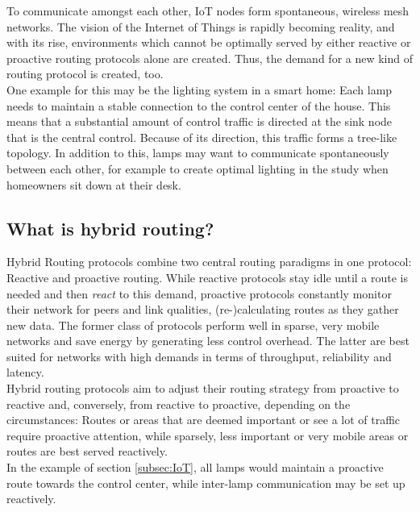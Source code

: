 \documentclass[a4paper,10pt]{scrartcl}
\begin{document}
To communicate amongst each other, IoT nodes form spontaneous, wireless mesh networks.
The vision of the Internet of Things is rapidly becoming reality, and with its rise, environments which cannot be optimally served by either reactive or proactive routing protocols alone are created. Thus, the demand for a new kind of routing protocol is created, too.\\
One example for this may be the lighting system in a smart home: Each lamp needs to maintain a stable connection to the control center of the house. This means that a substantial amount of control traffic is directed at the sink node that is the central control. Because of its direction, this traffic forms a tree-like topology. In addition to this, lamps may want to communicate spontaneously between each other, for example to create optimal lighting in the study when homeowners sit down at their desk.

\subsection{What is hybrid routing?}
\label{subsec:hybrid}
Hybrid Routing protocols combine two central routing paradigms in one protocol: Reactive and proactive routing. While reactive protocols stay idle until a route is needed and then \emph{react} to this demand, proactive protocols constantly monitor their network for peers and link qualities, (re-)calculating routes as they gather new data. The former class of protocols perform well in sparse, very mobile networks and save energy by generating less control overhead. The latter are best suited for networks with high demands in terms of throughput, reliability and latency.\\
Hybrid routing protocols aim to adjust their routing strategy from proactive to reactive and, conversely, from reactive to proactive, depending on the circumstances: Routes or areas that are deemed important or see a lot of traffic require proactive attention, while sparsely, less important or very mobile areas or routes are best served reactively.\\
In the example of section \ref{subsec:IoT}, all lamps would maintain a proactive route towards the control center, while inter-lamp communication may be set up reactively.\\
\end{document}
